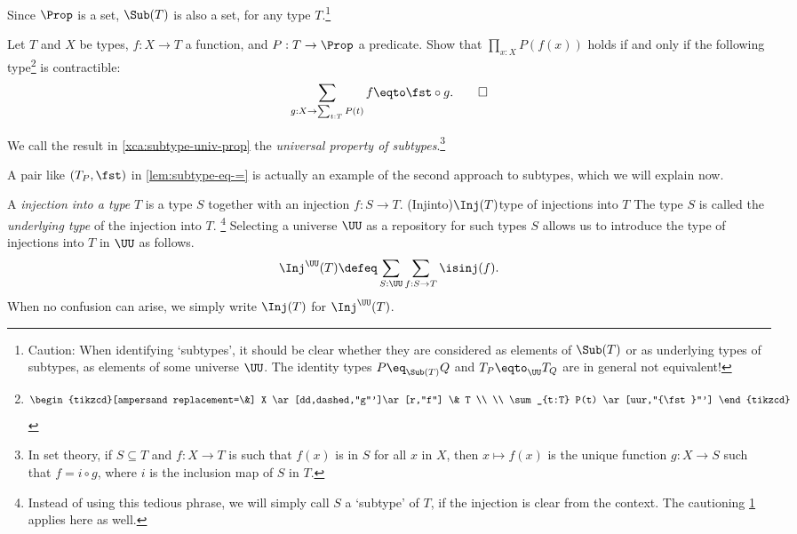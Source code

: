Since $\Prop$ is a set, $\Sub(T)$ is also a set, for any type $T$.\footnote{%
\label{ft:caution-subtype}
Caution: When identifying `subtypes', it
should be clear whether they are considered as elements of $\Sub(T)$ or
as underlying types of subtypes, \ie as elements of some universe $\UU$.
The identity types $P\eq_{\Sub(T)} Q$ and $T_P\eqto_{\UU} T_Q$ are in general
not equivalent!}

\begin{xca}\label{xca:subtype-univ-prop}
  Let $T$ and $X$ be types, $f: X\to T$ a function,
  and $P : T\to\Prop$ a predicate. Show that $\prod_{x:X} P(f(x))$
  holds if and only if the following type\footnote{\label{ft:subtype-univ-prop}%
    \[
      \begin{tikzcd}[ampersand replacement=\&]
        X \ar[dd,dashed,"g"']\ar[r,"f"] \& T \\
        \\
        \sum_{t:T} P(t) \ar[uur,"{\fst}"']
      \end{tikzcd}
    \]}
  is contractible:
   \begin{displaymath}
    \sum_{g: X \to \sum_{t:T} P(t)} f \eqto \fst\circ g.\qedhere
  \end{displaymath}
\end{xca}

We call the result in \cref{xca:subtype-univ-prop} the 
\emph{universal property of subtypes}.\footnote{%
In set theory, if $S\subseteq T$ and $f: X\to T$ is such that
$f(x)$ is in $S$ for all $x$ in $X$, then $x\mapsto f(x)$ is the
unique function $g: X\to S$ such that $f=i\circ g$, where $i$ is the
inclusion map of $S$ in $T$.}

A pair like $(T_P,\fst)$ in \cref{lem:subtype-eq-=} is actually an 
example of the second approach to subtypes, which we will explain now.  

\begin{definition}\label{def:injtype}
  A \emph{injection into a type} $T$
  is a type $S$ together with an injection $f : S \to T$.%
  \glossary(Injinto){$\protect\Inj(T)$}{type of injections into $T$}
  The type $S$ is called the \emph{underlying type} of the injection into $T$.%
  \footnote{Instead of using this tedious phrase, we will simply call $S$
  a `subtype' of $T$, if the injection is clear from the context.
  The cautioning \cref{ft:caution-subtype} applies here as well.}
  Selecting a universe $\UU$ as a repository for such types $S$ allows
  us to introduce the type of injections into $T$ in $\UU$ as follows.
  \[
  \Inj^\UU(T) \defeq \sum_{S:\UU}\sum_{f:S\to T}\isinj(f).
  \]
  When no confusion can arise, we simply write $\Inj(T)$ for $\Inj^\UU(T)$.
\end{definition}

